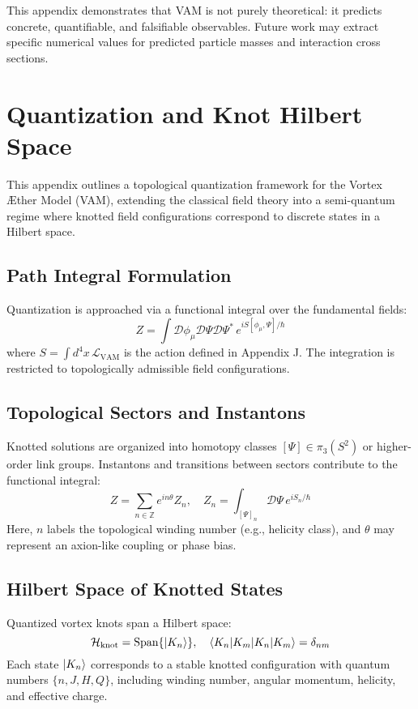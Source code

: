 This appendix demonstrates that VAM is not purely theoretical: it predicts concrete, quantifiable, and falsifiable observables. Future work may extract specific numerical values for predicted particle masses and interaction cross sections.

\section{Quantization and Knot Hilbert Space}
This appendix outlines a topological quantization framework for the Vortex \AE{}ther Model (VAM), extending the classical field theory into a semi-quantum regime where knotted field configurations correspond to discrete states in a Hilbert space.

\subsection{Path Integral Formulation}
Quantization is approached via a functional integral over the fundamental fields:
\begin{equation}
    Z = \int \mathcal{D}\phi_\mu \mathcal{D}\Psi \mathcal{D}\Psi^* \, e^{i S[\phi_\mu, \Psi] / \hbar}
\end{equation}
where $S = \int d^4x \, \mathcal{L}_{\text{VAM}}$ is the action defined in Appendix J. The integration is restricted to topologically admissible field configurations.

\subsection{Topological Sectors and Instantons}
Knotted solutions are organized into homotopy classes $[\Psi] \in \pi_3(S^2)$ or higher-order link groups. Instantons and transitions between sectors contribute to the functional integral:
\begin{equation}
    Z = \sum_{n \in \mathbb{Z}} e^{i n \theta} Z_n, \quad Z_n = \int_{[\Psi]_n} \mathcal{D} \Psi \, e^{i S_n / \hbar}
\end{equation}
Here, $n$ labels the topological winding number (e.g., helicity class), and $\theta$ may represent an axion-like coupling or phase bias.

\subsection{Hilbert Space of Knotted States}
Quantized vortex knots span a Hilbert space:
\begin{equation}
    \mathcal{H}_{\text{knot}} = \text{Span} \{ \ket{K_n} \}, \quad \braket{K_n | K_m} = \delta_{nm}
\end{equation}
Each state $\ket{K_n}$ corresponds to a stable knotted configuration with quantum numbers $\{ n, J, H, Q \}$, including winding number, angular momentum, helicity, and effective charge.

